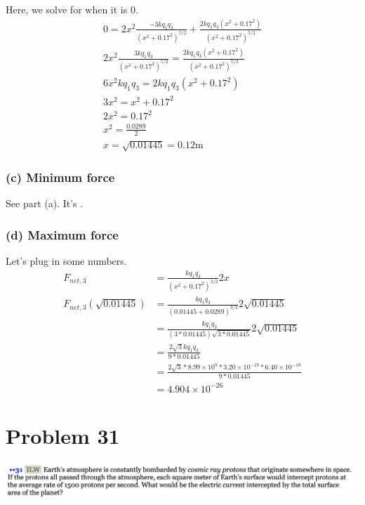 \documentclass[12pt]{article}
\begin{document}
Here, we solve for when it is 0.
\begin{gather*}
    0   =   2x^2 \frac{-3 k q_1 q_3}{(x^2 + 0.17^2)^{5/2}} + \frac{2 k q_1 q_3 (x^2 + 0.17^2)}{(x^2 + 0.17^2)^{5/2}}\\
    2x^2 \frac{3 k q_1 q_3}{(x^2 + 0.17^2)^{5/2}} = \frac{2 k q_1 q_3 (x^2 + 0.17^2)}{(x^2 + 0.17^2)^{5/2}}\\
    6x^2 k q_1 q_3 = 2 k q_1 q_3 (x^2 + 0.17^2)\\
    3x^2 = x^2 + 0.17^2\\
    2x^2 = 0.17^2\\
    x^2 = \frac{0.0289}{2}\\
    x   =   \sqrt{0.01445} = \boxed{0.12 \unit{\meter}}
\end{gather*}

\subsubsection*{(c) Minimum force}
See part (a). It's \boxed{0 \unit{\newton}}.

\subsubsection*{(d) Maximum force}
Let's plug in some numbers.
\begin{align*}
    F_{net,3}   &=  \frac{k q_1 q_3}{(x^2 + 0.17^2)^{3/2}}2x\\
    F_{net,3}(\sqrt{0.01445})   &=  \frac{k q_1 q_3}{(0.01445 + 0.0289)^{3/2}}2\sqrt{0.01445}\\
        &=  \frac{k q_1 q_3}{(3*0.01445)\sqrt{3*0.01445}}2\sqrt{0.01445}\\
        &=  \frac{2\sqrt{3} k q_1 q_3}{9*0.01445}\\
        &=  \frac{2\sqrt{3}*8.99 \times 10^9 * 3.20 \times 10^{-19} * 6.40 \times 10^{-19}}{9*0.01445}\\
        &=  \boxed{4.904 \times 10^{-26}}
\end{align*}

\pagebreak
\section*{Problem 31}
\includegraphics[width=\textwidth]{picture_7.png} 
\end{document}
